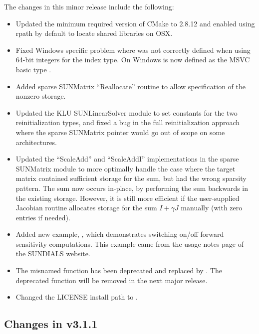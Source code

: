 The changes in this minor release include the following:
\begin{itemize}
\item Updated the minimum required version of CMake to 2.8.12 and enabled
  using rpath by default to locate shared libraries on OSX.
\item Fixed Windows specific problem where  was not correctly
  defined when using 64-bit integers for the {\sundials} index type. On Windows
   is now defined as the MSVC basic type .
\item Added sparse SUNMatrix ``Reallocate'' routine to allow specification of
  the nonzero storage.
\item Updated the KLU SUNLinearSolver module to set constants for the two
  reinitialization types, and fixed a bug in the full reinitialization
  approach where the sparse SUNMatrix pointer would go out of scope on
  some architectures.
\item Updated the ``ScaleAdd'' and ``ScaleAddI'' implementations in the
  sparse SUNMatrix module to more optimally handle the case where the
  target matrix contained sufficient storage for the sum, but had the
  wrong sparsity pattern.  The sum now occurs in-place, by performing
  the sum backwards in the existing storage.  However, it is still more
  efficient if the user-supplied Jacobian routine allocates storage for
  the sum $I+\gamma J$ manually (with zero entries if needed).
\item Added new example, , which demonstrates
  switching on/off forward sensitivity computations. This example came from
  the usage notes page of the SUNDIALS website.
\item The misnamed function  has been
  deprecated and replaced by . The deprecated
  function  will be removed in the next
  major release.
\item Changed the LICENSE install path to .
\end{itemize}

\subsection*{Changes in v3.1.1}

